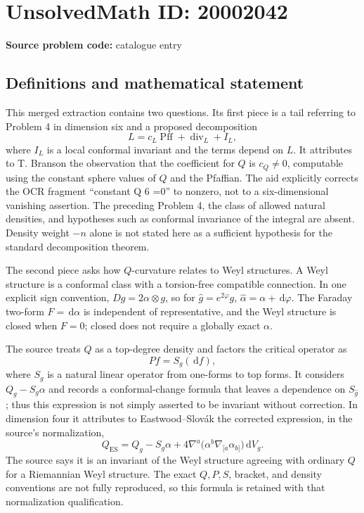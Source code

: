 \documentclass[11pt]{article}
\newcommand{\dd}{\,\mathrm{d}}
\begin{document}
\section*{UnsolvedMath ID: 20002042}
\textbf{Source problem code:} catalogue entry
\subsection{Definitions and mathematical statement}
This merged extraction contains two questions. Its first piece is a tail referring to Problem 4 in dimension six and a proposed decomposition
\[
 L=c_L\operatorname{Pff}+\operatorname{div}_L+I_L,
\]
where \(I_L\) is a local conformal invariant and the terms depend on \(L\). It attributes to T. Branson the observation that the coefficient for \(Q\) is \(c_Q\ne0\), computable using the constant sphere values of \(Q\) and the Pfaffian. The aid explicitly corrects the OCR fragment ``constant Q 6 =0'' to nonzero, not to a six-dimensional vanishing assertion. The preceding Problem 4, the class of allowed natural densities, and hypotheses such as conformal invariance of the integral are absent. Density weight \(-n\) alone is not stated here as a sufficient hypothesis for the standard decomposition theorem.

The second piece asks how \(Q\)-curvature relates to Weyl structures. A Weyl structure is a conformal class with a torsion-free compatible connection. In one explicit sign convention, \(Dg=2\alpha\otimes g\), so for \(\widehat g=e^{2\varphi}g\), \(\widehat\alpha=\alpha+\dd\varphi\). The Faraday two-form \(F=\dd\alpha\) is independent of representative, and the Weyl structure is closed when \(F=0\); closed does not require a globally exact \(\alpha\).

The source treats \(Q\) as a top-degree density and factors the critical operator as
\[
 P f=S_g(\dd f),
\]
where \(S_g\) is a natural linear operator from one-forms to top forms. It considers \(Q_g-S_g\alpha\) and records a conformal-change formula that leaves a dependence on \(S_{\widehat g}\); thus this expression is not simply asserted to be invariant without correction. In dimension four it attributes to Eastwood--Slovák the corrected expression, in the source's normalization,
\[
 Q_{\mathrm{ES}}=Q_g-S_g\alpha
 +4\nabla^a\bigl(\alpha^b\nabla_{[a}\alpha_{b]}\bigr)\dd V_g.
\]
The source says it is an invariant of the Weyl structure agreeing with ordinary \(Q\) for a Riemannian Weyl structure. The exact \(Q,P,S\), bracket, and density conventions are not fully reproduced, so this formula is retained with that normalization qualification.
\end{document}
